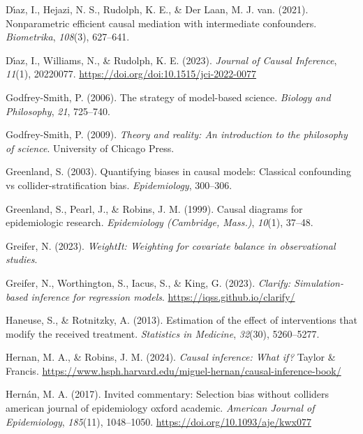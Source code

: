 \documentclass[
  single column]{article}
\newlength{\cslhangindent}
\newenvironment{CSLReferences}[2] %
 {\begin{list}{}{%
  \setlength{\itemindent}{0pt}
  \setlength{\leftmargin}{0pt}
  \setlength{\parsep}{0pt}
  \ifodd #1
   \setlength{\leftmargin}{\cslhangindent}
   \setlength{\itemindent}{-1\cslhangindent}
  \fi
  \setlength{\itemsep}{#2\baselineskip}}}
 {\end{list}}
\begin{document}
\begin{CSLReferences}{1}{0}
Dı́az, I., Hejazi, N. S., Rudolph, K. E., \& Der Laan, M. J. van. (2021).
Nonparametric efficient causal mediation with intermediate confounders.
\emph{Biometrika}, \emph{108}(3), 627--641.

Dı́az, I., Williams, N., \& Rudolph, K. E. (2023). \emph{Journal of
Causal Inference}, \emph{11}(1), 20220077.
\url{https://doi.org/doi:10.1515/jci-2022-0077}

Godfrey-Smith, P. (2006). The strategy of model-based science.
\emph{Biology and Philosophy}, \emph{21}, 725--740.

Godfrey-Smith, P. (2009). \emph{Theory and reality: An introduction to
the philosophy of science}. University of Chicago Press.

Greenland, S. (2003). Quantifying biases in causal models: Classical
confounding vs collider-stratification bias. \emph{Epidemiology},
300--306.

Greenland, S., Pearl, J., \& Robins, J. M. (1999). Causal diagrams for
epidemiologic research. \emph{Epidemiology (Cambridge, Mass.)},
\emph{10}(1), 37--48.

Greifer, N. (2023). \emph{WeightIt: Weighting for covariate balance in
observational studies}.

Greifer, N., Worthington, S., Iacus, S., \& King, G. (2023).
\emph{Clarify: Simulation-based inference for regression models}.
\url{https://iqss.github.io/clarify/}

Haneuse, S., \& Rotnitzky, A. (2013). Estimation of the effect of
interventions that modify the received treatment. \emph{Statistics in
Medicine}, \emph{32}(30), 5260--5277.

Hernan, M. A., \& Robins, J. M. (2024). \emph{Causal inference: What
if?} Taylor \& Francis.
\url{https://www.hsph.harvard.edu/miguel-hernan/causal-inference-book/}

Hernán, M. A. (2017). Invited commentary: Selection bias without
colliders \textbar{} american journal of epidemiology \textbar{} oxford
academic. \emph{American Journal of Epidemiology}, \emph{185}(11),
1048--1050. \url{https://doi.org/10.1093/aje/kwx077}


\end{CSLReferences}
\end{document}
